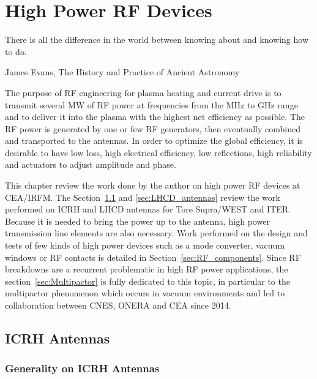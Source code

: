 \chapter{High Power RF Devices}
\label{chap:rf_power_devices}

\margintoc

\epigraph{There is all the difference in the world between knowing about and knowing how to do.}{James Evans, The History and Practice of Ancient Astronomy}

The purpose of RF engineering for plasma heating and current drive is to transmit several MW of RF power at frequencies from the MHz to GHz range and to deliver it into the plasma with the highest net efficiency as possible. The RF power is generated by one or few RF generators, then eventually combined and transported to the antennas. In order to optimize the global efficiency, it is desirable to have low loss, high electrical efficiency, low reflections, high reliability and actuators to adjust amplitude and phase. 

This chapter review the work done by the author on high power RF devices at CEA/IRFM. The Section~\ref{sec:ICRH_antennas} and \ref{sec:LHCD_antennas} review the work performed on ICRH and LHCD antennas for Tore Supra/WEST and ITER. Because it is needed to bring the power up to the antenna, high power transmission line elements are also necessary. Work performed on the design and tests of few kinds of high power devices such as a mode converter, vacuum windows or RF contacts is detailed in Section~\ref{sec:RF_components}. Since RF breakdowns are a recurrent problematic in high RF power applications, the section~\ref{sec:Multipactor} is fully dedicated to this topic, in particular to the multipactor phenomenon which occurs in vacuum environments and led to collaboration between CNES, ONERA and CEA since 2014.


\section{ICRH Antennas}\label{sec:ICRH_antennas}

\subsection{Generality on ICRH Antennas}

